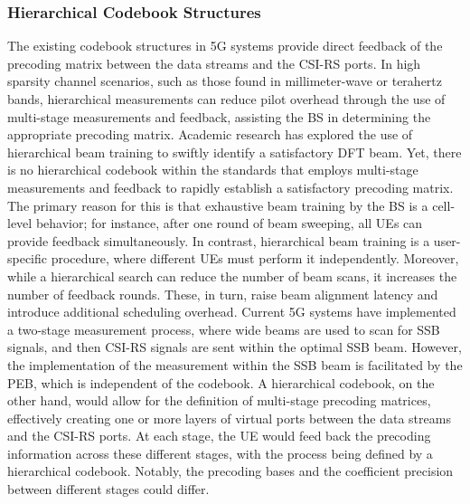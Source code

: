 \documentclass[lettersize,journal]{IEEEtran}
\begin{document}
\subsubsection{Hierarchical Codebook Structures}
The existing codebook structures in 5G systems provide direct feedback of the precoding matrix between the data streams and the CSI-RS ports. In high sparsity channel scenarios, such as those found in millimeter-wave or terahertz bands, hierarchical measurements can reduce pilot overhead through the use of multi-stage measurements and feedback, assisting the BS in determining the appropriate precoding matrix.  Academic research has explored the use of hierarchical beam training to swiftly identify a satisfactory DFT beam\cite{xiaocodebook,ningexh,ningwide}. Yet, there is no hierarchical codebook within the standards that employs multi-stage measurements and feedback to rapidly establish a satisfactory precoding matrix. The primary reason for this is that exhaustive beam training by the BS is a cell-level behavior; for instance, after one round of beam sweeping, all UEs can provide feedback simultaneously. In contrast, hierarchical beam training is a user-specific procedure, where different UEs must perform it independently. Moreover, while a hierarchical search can reduce the number of beam scans, it increases the number of feedback rounds. These, in turn, raise beam alignment latency and introduce additional scheduling overhead. Current 5G systems have implemented a two-stage measurement process, where wide beams are used to scan for SSB signals, and then CSI-RS signals are sent within the optimal SSB beam. However, the implementation of the measurement within the SSB beam is facilitated by the PEB, which is independent of the codebook. A hierarchical codebook, on the other hand, would allow for the definition of multi-stage precoding matrices, effectively creating one or more layers of virtual ports between the data streams and the CSI-RS ports. At each stage, the UE would feed back the precoding information across these different stages, with the process being defined by a hierarchical codebook. Notably, the precoding bases and the coefficient precision between different stages could differ.
\end{document}
